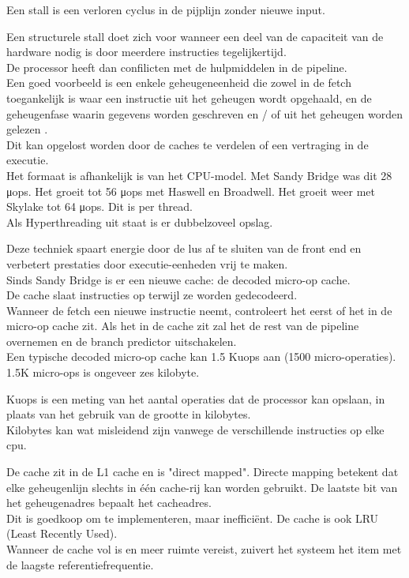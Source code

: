 Een stall is een verloren cyclus in de pijplijn zonder nieuwe input.

Een structurele stall doet zich voor wanneer een deel van de capaciteit van de hardware nodig is door meerdere instructies tegelijkertijd.\\
De processor heeft dan confilicten met de hulpmiddelen in de pipeline.\\
Een goed voorbeeld is een enkele geheugeneenheid die zowel in de fetch toegankelijk is waar een instructie uit het geheugen wordt opgehaald, en de geheugenfase waarin gegevens worden geschreven en / of uit het geheugen worden gelezen \parencite{Hennessy2009}.\\
Dit kan opgelost worden door de caches te verdelen of een vertraging in de executie.\\




Het formaat is afhankelijk is van het CPU-model.
Met Sandy Bridge was dit 28 μops. Het groeit tot 56 μops met Haswell en Broadwell. Het groeit weer met Skylake tot 64 μops. Dit is per thread.\\
Als Hyperthreading uit staat is er dubbelzoveel opslag.


Deze techniek spaart energie door de lus af te sluiten van de front end en verbetert prestaties door executie-eenheden vrij te maken.\\

Sinds Sandy Bridge is er een nieuwe cache: de decoded micro-op cache.\\

De cache slaat instructies op terwijl ze worden gedecodeerd.\\

Wanneer de fetch een nieuwe instructie neemt, controleert het eerst of het in de micro-op cache zit.
Als het in de cache zit zal het de rest van de pipeline overnemen en de branch predictor uitschakelen.\\
Een typische decoded micro-op cache kan 1.5 Kuops aan (1500 micro-operaties).\\
1.5K micro-ops is ongeveer zes kilobyte.

Kuops is een meting van het aantal operaties dat de processor kan opslaan, in plaats van het gebruik van de grootte in kilobytes.\\
Kilobytes kan wat misleidend zijn vanwege de verschillende instructies op elke cpu.

De cache zit in de L1 cache en is "direct mapped".
Directe mapping betekent dat elke geheugenlijn slechts in één cache-rij kan worden gebruikt.
De laatste bit van het geheugenadres bepaalt het cacheadres.\\
Dit is goedkoop om te implementeren, maar inefficiënt.
De cache is ook LRU (Least Recently Used).\\
Wanneer de cache vol is en meer ruimte vereist, zuivert het systeem het item met de laagste referentiefrequentie. \parencite{Lee2001}






